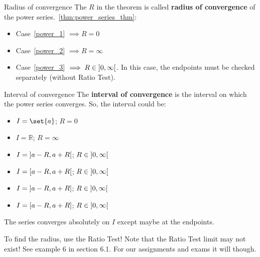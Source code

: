 \begin{Definition}{Radius of convergence}{}
    The $ R $ in the theorem is called \textbf{radius of convergence}
    of the power series.~\ref{thm:power_series_thm}:
    \begin{itemize}
        \item Case~\ref{power_1} $ \implies R=0 $
        \item Case~\ref{power_2} $ \implies R=\infty $
        \item Case~\ref{power_3} $ \implies R\in\interval[open]{0}{\infty} $. In this case,
              the endpoints must be checked separately (without Ratio Test).
    \end{itemize}
\end{Definition}

\begin{Definition}{Interval of convergence}{}
    The \textbf{interval of convergence} is the interval on which the power
    series converges. So, the interval could be:
    \begin{itemize}
        \item $ I=\set{a} $;
              $ R=0 $
        \item $ I=\mathbb{R} $;
              $ R=\infty $
        \item $ I=\interval[open]{a-R}{a+R} $;
              $ R\in\interval[open]{0}{\infty} $
        \item $ I=\interval[open right]{a-R}{a+R} $;
              $ R\in\interval[open]{0}{\infty} $
        \item $ I=\interval[open left]{a-R}{a+R} $;
              $ R\in\interval[open]{0}{\infty} $
        \item $ I=\interval{a-R}{a+R} $;
              $ R\in\interval[open]{0}{\infty} $
    \end{itemize}
\end{Definition}

\begin{Remark}{}{}
    The series converges absolutely on $ I $ except maybe at the endpoints.
\end{Remark}
To find the radius, use the Ratio Test! Note that the Ratio Test limit
may not exist! See example 6 in section 6.1. For our assignments and exams it will though.


